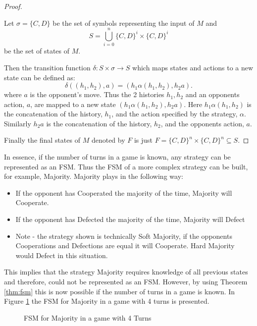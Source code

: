 \begin{proof}\label{prf:fsm}

Let $\sigma = \{C, D\}$ be the set of symbols representing the input of $M$ and
$$ S = \bigcup_{i=0}^{n} \{C, D\}^i \times \{C, D\}^i $$
be the set of states of $M$.

Then the transition function $\delta: S \times \sigma \rightarrow S$ which maps states and actions to a new state can be defined as:
$$
\delta((h_1, h_2), a) = (h_1 \alpha(h_1, h_2), h_2a).
$$
where $a$ is the opponent's move.
Thus the 2 histories $h_1, h_2$ and an opponents action, $a$, are mapped to a new state $(h_1 \alpha(h_1, h_2), h_2a)$.
Here $h_1 \alpha(h_1, h_2)$ is the concatenation of the history, $h_1$, and the action specified by the strategy, $\alpha$.
Similarly $h_2a$ is the concatenation of the history, $h_2$, and the opponents action, $a$.

Finally the final states of $M$ denoted by $F$ is just $F = \{C, D\}^{n} \times \{C, D\}^{n} \subseteq S$.

\end{proof}

In essence, if the number of turns in a game is known, any strategy can be represented as an FSM.
Thus the FSM of a more complex strategy can be built, for example, Majority.
Majority plays in the following way:

\begin{itemize}
  \item If the opponent has Cooperated the majority of the time, Majority will Cooperate.
  \item If the opponent has Defected the majority of the time, Majority will Defect
  \item Note - the strategy shown is technically Soft Majority, if the opponents Cooperations and Defections are equal it will Cooperate. Hard Majority would Defect in this situation.
\end{itemize}

This implies that the strategy Majority requires knowledge of all previous states and therefore, could not be represented as an FSM.
However, by using Theorem \ref{thm:fsm} this is now possible if the number of turns in a game is known.
In Figure \ref{fig:MajorityFSM} the FSM for Majority in a game with 4 turns is presented.

\begin{figure}[hbtp!]
\centering

\caption{FSM for Majority in a game with 4 Turns}
\label{fig:MajorityFSM}
\end{figure}

